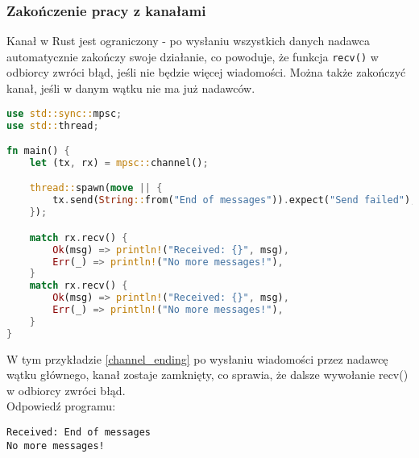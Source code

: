 \subsubsection{Zakończenie pracy z kanałami}
Kanał w Rust jest ograniczony - po wysłaniu wszystkich danych nadawca automatycznie zakończy swoje działanie, co powoduje, że funkcja \texttt{recv()} w odbiorcy zwróci błąd, jeśli nie będzie więcej wiadomości. Można także zakończyć kanał, jeśli w danym wątku nie ma już nadawców.
\begin{lstlisting}[language=Rust, caption=Zakończenie kanału, label=channel_ending]
use std::sync::mpsc;
use std::thread;

fn main() {
    let (tx, rx) = mpsc::channel();

    thread::spawn(move || {
        tx.send(String::from("End of messages")).expect("Send failed");
    });

    match rx.recv() {
        Ok(msg) => println!("Received: {}", msg),
        Err(_) => println!("No more messages!"),
    }
    match rx.recv() {
        Ok(msg) => println!("Received: {}", msg),
        Err(_) => println!("No more messages!"),
    }
}

\end{lstlisting}
W tym przykładzie \ref{channel_ending} po wysłaniu wiadomości przez nadawcę wątku głównego, kanał zostaje zamknięty, co sprawia, że dalsze wywołanie recv() w odbiorcy zwróci błąd.\\
Odpowiedź programu:
\begin{verbatim}
Received: End of messages
No more messages!
\end{verbatim}

